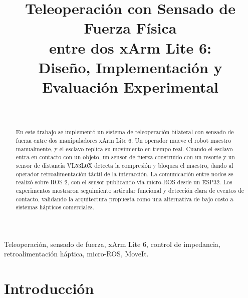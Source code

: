 \documentclass[journal,10pt,twoside]{IEEEtran}
\begin{document}
\title{Teleoperación con Sensado de Fuerza Física\\
  entre dos xArm Lite 6:\\
  Diseño, Implementación y Evaluación Experimental}

\author{%
  \\
}

\maketitle

\begin{abstract}
En este trabajo se implementó un sistema de teleoperación bilateral con sensado de fuerza entre dos manipuladores xArm Lite 6. Un operador mueve el robot maestro manualmente, y el esclavo replica su movimiento en tiempo real. Cuando el esclavo entra en contacto con un objeto, un sensor de fuerza construido con un resorte y un sensor de distancia VL53L0X detecta la compresión y bloquea el maestro, dando al operador retroalimentación táctil de la interacción.
La comunicación entre nodos se realizó sobre ROS 2, con el sensor publicando vía micro-ROS desde un ESP32. Los experimentos mostraron seguimiento articular funcional y detección clara de eventos de contacto, validando la arquitectura propuesta como una alternativa de bajo costo a sistemas hápticos comerciales.
\end{abstract}

\begin{IEEEkeywords}
Teleoperación, sensado de fuerza, xArm Lite 6, control de impedancia, retroalimentación háptica, micro-ROS, MoveIt.
\end{IEEEkeywords}

\section{Introducción}
\end{document}
